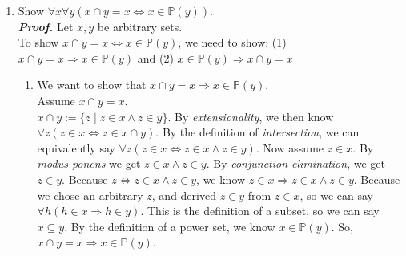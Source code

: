 \documentclass[11pt,a4paper]{article}
\begin{document}
\begin{enumerate}
\begin{enumerate}
        \item 
        Show $\forall x \forall y (x \cap y = x \Leftrightarrow x \in \mathbb{P} (y))$. \\
        \emph{\textbf{Proof.}} Let $x, y$ be arbitrary sets. \\
        To show $x \cap y = x \Leftrightarrow x \in \mathbb{P} (y)$, we need to show: (1) $x \cap y = x \Rightarrow x \in \mathbb{P} (y) $ and (2) $x \in \mathbb{P} (y) \Rightarrow x \cap y = x $
            \begin{enumerate}
                \item 
                We want to show that $x \cap y = x \Rightarrow x \in \mathbb{P} (y) $. \\
                Assume $x \cap y = x$. \\ 
                $x \cap y := \{z \mid z \in x \land z \in y\} $. By \emph{extensionality}, we then know $\forall z (z \in x \Leftrightarrow z \in x \cap y) $.  
                By the definition of \emph{intersection}, we can equivalently say $\forall z(z \in x \Leftrightarrow z \in x \land z \in y )$. Now assume $z \in x $. By \emph{modus ponens} we get $z \in x \land z \in y $. By \emph{conjunction elimination}, we get $z \in y $.
                Because $z \Leftrightarrow z \in x \land z \in y $, we know $z \in x \Rightarrow z \in x \land z \in y $. Because we chose an arbitrary $z$, and derived $z \in y $ from $z \in x $, so we can say $\forall h (h \in x \Rightarrow h \in y) $. 
                This is the definition of a subset, so we can say $x \subseteq y $. By the definition of a power set, we know $x \in \mathbb{P} (y) $. So, $x \cap y = x \Rightarrow x \in \mathbb{P} (y) $.   


\end{enumerate}
\end{enumerate}
\end{enumerate}
\end{document}
